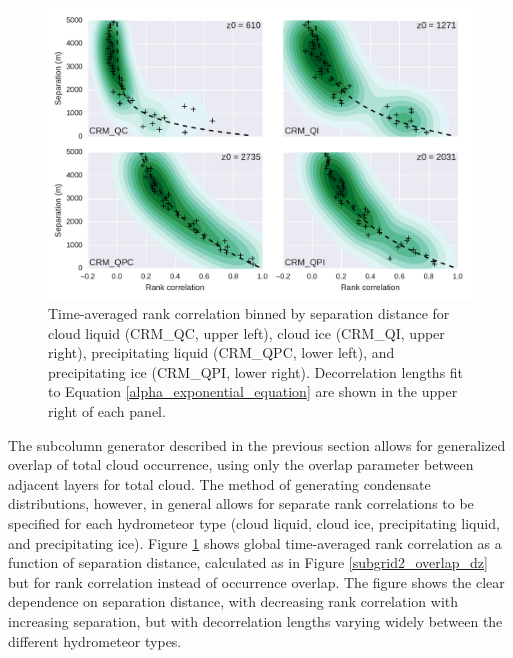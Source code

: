 \begin{figure}
\centering
\includegraphics[width=\columnwidth]{graphics/subgrid2_rankcorr_dz.pdf}
\caption{Time-averaged rank correlation binned by separation distance for cloud liquid (CRM\_QC, upper left), cloud ice (CRM\_QI, upper right), precipitating liquid (CRM\_QPC, lower left), and precipitating ice (CRM\_QPI, lower right). Decorrelation lengths fit to Equation \ref{alpha_exponential_equation} are shown in the upper right of each panel.}
\label{subgrid2_rankcorr_dz}
\end{figure}

The subcolumn generator described in the previous section allows for generalized overlap of total cloud occurrence, using only the overlap parameter between adjacent layers for total cloud. The method of generating condensate distributions, however, in general allows for separate rank correlations to be specified for each hydrometeor type (cloud liquid, cloud ice, precipitating liquid, and precipitating ice). Figure \ref{subgrid2_rankcorr_dz} shows global time-averaged rank correlation as a function of separation distance, calculated as in Figure \ref{subgrid2_overlap_dz} but for rank correlation instead of occurrence overlap. The figure shows the clear dependence on separation distance, with decreasing rank correlation with increasing separation, but with decorrelation lengths varying widely between the different hydrometeor types.

